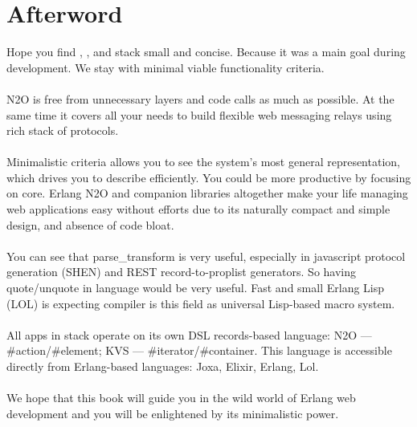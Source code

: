 
\begingroup
\section{Afterword}

Hope you find ,
, and
 stack small and concise.
Because it was a main goal during development.
We stay with minimal viable functionality criteria.

\paragraph{}
N2O is free from unnecessary layers and code calls as much as possible.
At the same time it covers all your needs to build
flexible web messaging relays using rich stack of protocols.

\paragraph{}
Minimalistic criteria allows you to see the system's
most general representation, which drives you to describe efficiently.
You could be more productive by focusing on core.
Erlang N2O and companion libraries altogether make
your life managing web applications easy without
efforts due to its naturally compact and simple design, and absence of code bloat.

\paragraph{}
You can see that parse\_transform is very useful, especially in javascript
protocol generation (SHEN) and REST record-to-proplist generators. So having
quote/unquote in language would be very useful. Fast and small
Erlang Lisp (LOL) is expecting compiler is this field as universal
Lisp-based macro system.

\paragraph{}
All apps in stack operate on its own DSL records-based language:
N2O --- \#action/\#element; KVS --- \#iterator/\#container.
This language is accessible directly from Erlang-based languages: Joxa, Elixir, Erlang, Lol.

\paragraph{}
We hope that this book will guide you in the wild world of Erlang web development
and you will be enlightened by its minimalistic power.
\endgroup
